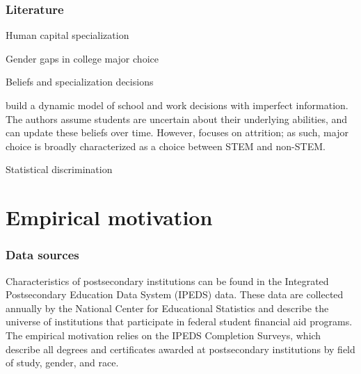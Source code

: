 \documentclass[10 pt]{article}
\newcommand{\toedit}[1]{{\color{gray}#1}}
\newcommand{\toedit}[1]{#1}
\begin{document}
\subsubsection*{Literature}

\begin{outline}

\item Human capital specialization 

\item Gender gaps in college major choice

\item Beliefs and specialization decisions

\begin{blist}

\item \textcite{AAMR16-wp} build a dynamic model of school and work decisions with imperfect information. 
The authors assume students are uncertain about their underlying abilities, and can update these beliefs over time. 
\toedit{However, \textcite{AAMR16-wp} focuses on attrition; as such, major choice is broadly characterized as a choice between STEM and non-STEM.}

\end{blist}

\item Statistical discrimination

\end{outline}

\section{Empirical motivation}

\subsubsection*{Data sources}

Characteristics of postsecondary institutions can be found in the Integrated Postsecondary Education Data System (IPEDS) data.
These data are collected annually by the National Center for Educational Statistics and describe the universe of institutions that participate in federal student financial aid programs. 
The empirical motivation relies on the IPEDS Completion Surveys, which describe all degrees and certificates awarded at postsecondary institutions by field of study, gender, and race. 
\end{document}
